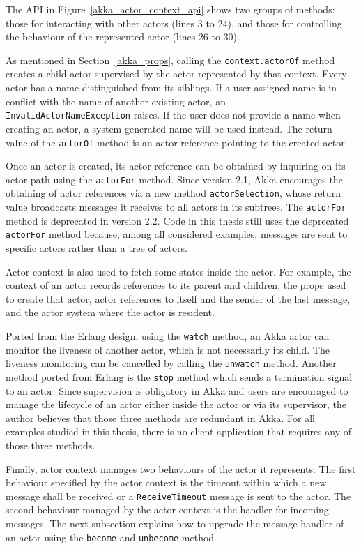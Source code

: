 The API in Figure~\ref{akka_actor_context_api} shows two groups of methods: 
those for interacting with other actors (lines 3 to 24), and those for 
controlling the behaviour of the represented actor (lines 26 to 30).  

As mentioned in Section~\ref{akka_props}, calling the {\tt context.actorOf} 
method creates a child actor supervised by the actor represented by that 
context.  Every actor has a name distinguished from its siblings.  If a user 
assigned name is in conflict with the name of another existing actor, an {\tt 
InvalidActorNameException} raises. If the user does not provide a name when 
creating an actor, a system generated name will be used instead. The return 
value of the {\tt actorOf} method is an actor reference pointing to the created 
actor.

Once an actor is created, its actor reference can be obtained by inquiring on 
its actor path using the {\tt actorFor} method.  Since version 2.1, Akka 
encourages the obtaining of actor references via a new method 
{\tt actorSelection}, whose return value broadcasts messages it receives to all 
actors in its subtrees.  The {\tt actorFor} method is deprecated in version 
2.2. Code in this thesis still uses the deprecated {\tt actorFor} method 
because, among all considered examples, messages are sent to specific actors
rather than a tree of actors.

Actor context is also used to fetch some states inside the actor.  For example,
the context of an actor records references to its parent and children, the props
used to create that actor, actor references to itself and the sender of the last
message, and the actor system where the actor is resident.

Ported from the Erlang design, using the {\tt watch} method, an Akka actor can 
monitor the liveness of another actor, which is not necessarily its child.  The 
liveness monitoring can be cancelled by calling the {\tt unwatch} method.  
Another method ported from Erlang is the {\tt stop} method which sends a 
termination signal to an actor.  Since supervision is obligatory in Akka and 
users are encouraged to manage the lifecycle of an actor either inside the 
actor or via its supervisor, the author believes that those three methods are 
redundant in Akka.  For all examples studied in this thesis, there is no client 
application that requires any of those three methods.

Finally, actor context manages two behaviours of the actor it represents.  The 
first behaviour specified by the actor context is the timeout within which a 
new message shall be received or a {\tt  ReceiveTimeout} message is sent to the 
actor.  The second behaviour managed by the actor context is the handler for 
incoming messages.  The next subsection explains how to upgrade the message 
handler of an actor using the {\tt become} and {\tt unbecome} method.


